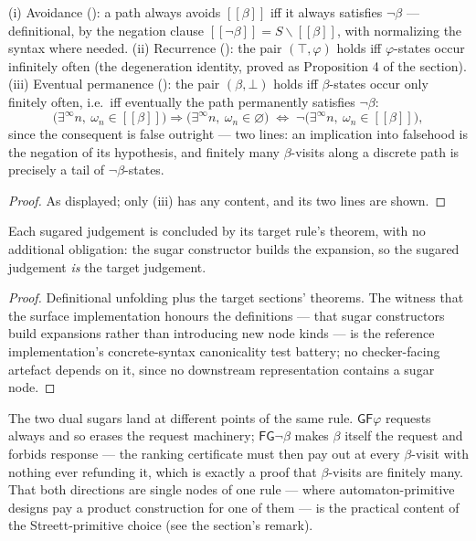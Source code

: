 \begin{bprop}\label{prop:sb-exact}
(i) Avoidance (): a path always avoids
$[\![\beta]\!]$ iff it always
satisfies $\neg\beta$ --- definitional, by the negation clause
$[\![\neg\beta]\!] = S \smallsetminus [\![\beta]\!]$, with
 normalizing the syntax where needed.
(ii) Recurrence (): the pair $(\top, \varphi)$ holds iff
$\varphi$-states occur infinitely often (the degeneration identity,
proved as Proposition 4 of the  section).
(iii) Eventual permanence (): the pair $(\beta, \bot)$ holds iff
$\beta$-states occur only finitely often, i.e.\ iff eventually the path
permanently satisfies $\neg\beta$:
\[
\bigl(\exists^\infty n,\ \omega_n \in [\![\beta]\!]\bigr) \Rightarrow
\bigl(\exists^\infty n,\ \omega_n \in \varnothing\bigr)
\;\Longleftrightarrow\;
\neg\bigl(\exists^\infty n,\ \omega_n \in [\![\beta]\!]\bigr) ,
\]
since the consequent is false outright --- two lines: an implication
into falsehood is the negation of its hypothesis, and finitely many
$\beta$-visits along a discrete path is precisely a tail of
$\neg\beta$-states.
\end{bprop}
\begin{proof}
As displayed; only (iii) has any content, and its two lines are shown.
\end{proof}

\begin{bprop}\label{prop:sb-sound}
Each sugared judgement is concluded by its target rule's theorem, with
no additional obligation: the sugar constructor builds the expansion,
so the sugared judgement \emph{is} the target judgement.
\end{bprop}
\begin{proof}
Definitional unfolding plus the target sections' theorems. The witness
that the surface implementation honours the definitions --- that sugar
constructors build expansions rather than introducing new node kinds ---
is the reference implementation's concrete-syntax canonicality test
battery; no checker-facing artefact depends on it, since no downstream
representation contains a sugar node.
\end{proof}

\begin{bremark}
The two dual sugars land at different points of the same rule.
$\mathsf{GF}\varphi$ requests always and so erases the request
machinery; $\mathsf{FG}\neg\beta$ makes $\beta$ itself the request and
forbids response --- the ranking certificate must then pay out at every
$\beta$-visit with nothing ever refunding it, which is exactly a proof
that $\beta$-visits are finitely many. That both directions are single
nodes of one rule --- where automaton-primitive designs pay a product
construction for one of them --- is the practical content of the
Streett-primitive choice (see the  section's
remark).
\end{bremark}

